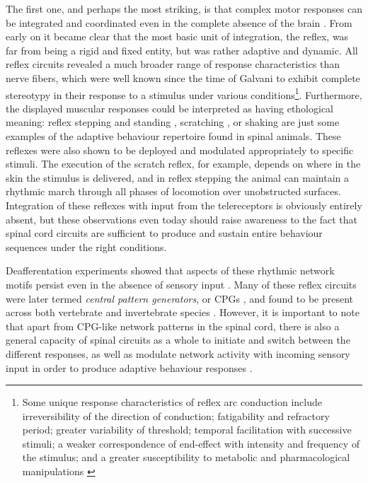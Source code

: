 The first one, and perhaps the most striking, is that complex motor responses can be integrated and coordinated even in the complete absence of the brain \cite{Sherrington1906}. From early on it became clear that the most basic unit of integration, the reflex, was far from being a rigid and fixed entity, but was rather adaptive and dynamic. All reflex circuits revealed a much broader range of response characteristics than nerve fibers, which were well known since the time of Galvani to exhibit complete stereotypy in their response to a stimulus under various conditions\footnote{Some unique response characteristics of reflex arc conduction include irreversibility of the direction of conduction; fatigability and refractory period; greater variability of threshold; temporal facilitation with successive stimuli; a weaker correspondence of end-effect with intensity and frequency of the stimulus; and a greater susceptibility to metabolic and pharmacological manipulations \cite[p.14]{Sherrington1906}}. Furthermore, the displayed muscular responses could be interpreted as having ethological meaning: reflex stepping and standing \cite{Sherrington1910, Sherrington1915}, scratching \cite{Sherrington1903}, or shaking \cite{Goltz1896, Sherrington1903} are just some examples of the adaptive behaviour repertoire found in spinal animals. These reflexes were also shown to be deployed and modulated appropriately to specific stimuli. The execution of the scratch reflex, for example, depends on where in the skin the stimulus is delivered, and in reflex stepping the animal can maintain a rhythmic march through all phases of locomotion over unobstructed surfaces. Integration of these reflexes with input from the telereceptors is obviously entirely absent, but these observations even today should raise awareness to the fact that spinal cord circuits are sufficient to produce and sustain entire behaviour sequences under the right conditions.

Deafferentation experiments showed that aspects of these rhythmic network motifs persist even in the absence of sensory input \cite{GrahamBrown1911}. Many of these reflex circuits were later termed \emph{central pattern generators}, or CPGs \cite{Grillner1975, Grillner1981}, and found to be present across both vertebrate and invertebrate species \cite{Orlovsky1999,Selverston2010}. However, it is important to note that apart from CPG-like network patterns in the spinal cord, there is also a general capacity of spinal circuits as a whole to initiate and switch between the different responses, as well as modulate network activity with incoming sensory input in order to produce adaptive behaviour responses \cite{Forssberg1975}.

